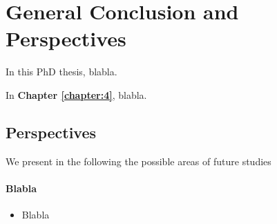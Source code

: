 
\chapter*{General Conclusion and Perspectives}
\label{chapter:conclusion}
\graphicspath{{2-Chapters/6-Chapter/Images/}}

In this PhD thesis, blabla.

In \textbf{Chapter \ref{chapter:4}}, blabla.


\section*{Perspectives}
We present in the following the possible areas of future studies

\subsubsection*{Blabla}
\begin{itemize}
\item Blabla
\end{itemize}
